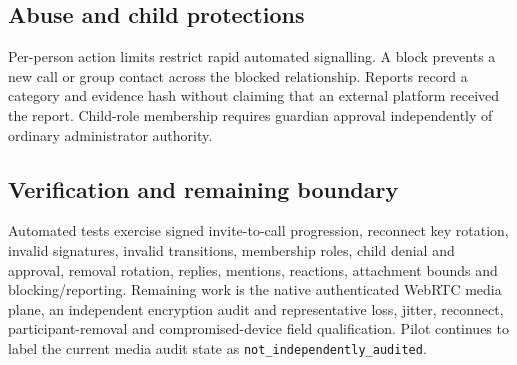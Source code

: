\subsection{Abuse and child protections}

Per-person action limits restrict rapid automated signalling.  A block prevents a
new call or group contact across the blocked relationship.  Reports record a
category and evidence hash without claiming that an external platform received the
report.  Child-role membership requires guardian approval independently of ordinary
administrator authority.

\subsection{Verification and remaining boundary}

Automated tests exercise signed invite-to-call progression, reconnect key rotation,
invalid signatures, invalid transitions, membership roles, child denial and
approval, removal rotation, replies, mentions, reactions, attachment bounds and
blocking/reporting.  Remaining work is the native authenticated WebRTC media plane,
an independent encryption audit and representative loss, jitter, reconnect,
participant-removal and compromised-device field qualification.  Pilot continues to
label the current media audit state as \texttt{not\_independently\_audited}.
